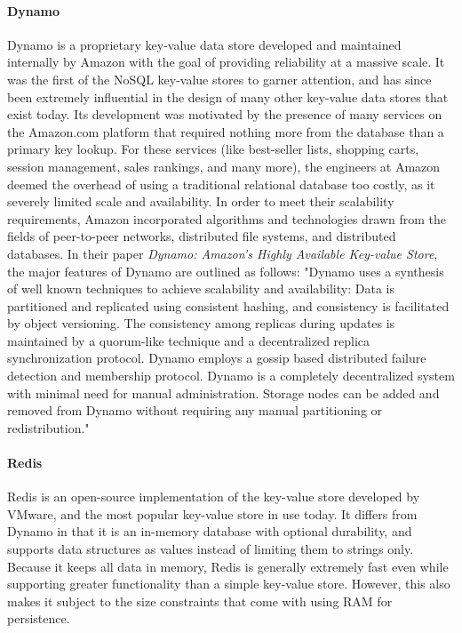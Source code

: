 \documentclass[11pt,a4paper]{report}
\begin{document}
\paragraph{Dynamo}
Dynamo is a proprietary key-value data store developed and maintained internally by Amazon with the goal of providing reliability at a massive scale.\cite{decandia2007dynamo} It was the first of the NoSQL key-value stores to garner attention, and has since been extremely influential in the design of many other key-value data stores that exist today.\cite{strauch2011nosql} Its development was motivated by the presence of many services on the Amazon.com platform that required nothing more from the database than a primary key lookup. For these services (like best-seller lists, shopping carts, session management, sales rankings, and many more), the engineers at Amazon deemed the overhead of using a traditional relational database too costly, as it severely limited scale and availability.\cite{decandia2007dynamo}  In order to meet their scalability requirements, Amazon incorporated algorithms and technologies drawn from the fields of peer-to-peer networks, distributed file systems, and distributed databases.\cite{orend2010analysis} In their paper \textit{Dynamo: Amazon's Highly Available Key-value Store}, the major features of Dynamo are outlined as follows:  "Dynamo uses a synthesis of well known techniques to achieve scalability and availability: Data is partitioned and replicated using consistent hashing, and consistency is facilitated by object versioning. The consistency among replicas during updates is maintained by a quorum-like technique and a decentralized replica synchronization protocol. Dynamo employs a gossip based distributed failure detection and membership protocol. Dynamo is a completely decentralized system with minimal need for manual administration. Storage nodes can be added and removed from Dynamo without requiring any manual partitioning or redistribution."\cite{decandia2007dynamo}

\paragraph{Redis}
Redis is an open-source implementation of the key-value store developed by VMware, and the most popular key-value store in use today.\cite{dbranking,paksulapersisting} It differs from Dynamo in that it is an in-memory database with optional durability, and supports data structures as values instead of limiting them to strings only. Because it keeps all data in memory, Redis is generally extremely fast even while supporting greater functionality than a simple key-value store. However, this also makes it subject to the size constraints that come with using RAM for persistence.\cite{paksulapersisting} 
\end{document}
